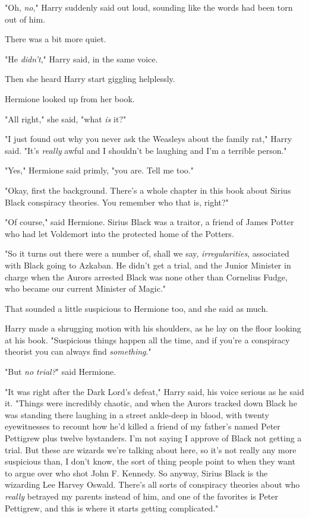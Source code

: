 "Oh, \emph{no}," Harry suddenly said out loud, sounding like the words had been 
torn out of him.

There was a bit more quiet.

"He \emph{didn't}," Harry said, in the same voice.

Then she heard Harry start giggling helplessly.

Hermione looked up from her book.

"All right," she said, "what \emph{is} it?"

"I just found out why you never ask the Weasleys about the family rat," Harry 
said. "It's \emph{really} awful and I shouldn't be laughing and I'm a terrible 
person."

"Yes," Hermione said primly, "you are. Tell me too."

"Okay, first the background. There's a whole chapter in this book about Sirius 
Black conspiracy theories. You remember who that is, right?"

"Of course," said Hermione. Sirius Black was a traitor, a friend of James 
Potter who had let Voldemort into the protected home of the Potters.

"So it turns out there were a number of, shall we say, \emph{irregularities}, 
associated with Black going to Azkaban. He didn't get a trial, and the Junior 
Minister in charge when the Aurors arrested Black was none other than Cornelius 
Fudge, who became our current Minister of Magic."

That sounded a little suspicious to Hermione too, and she said as much.

Harry made a shrugging motion with his shoulders, as he lay on the floor 
looking at his book. "Suspicious things happen all the time, and if you're a 
conspiracy theorist you can always find \emph{something}."

"But \emph{no trial?}" said Hermione.

"It was right after the Dark Lord's defeat," Harry said, his voice serious as 
he said it. "Things were incredibly chaotic, and when the Aurors tracked down 
Black he was standing there laughing in a street ankle-deep in blood, with 
twenty eyewitnesses to recount how he'd killed a friend of my father's named 
Peter Pettigrew plus twelve bystanders. I'm not saying I approve of Black not 
getting a trial. But these are wizards we're talking about here, so it's not 
really any more suspicious than, I don't know, the sort of thing people point 
to when they want to argue over who shot John F. Kennedy. So anyway, Sirius 
Black is the wizarding Lee Harvey Oswald. There's all sorts of conspiracy 
theories about who \emph{really} betrayed my parents instead of him, and one of 
the favorites is Peter Pettigrew, and this is where it starts getting 
complicated."

